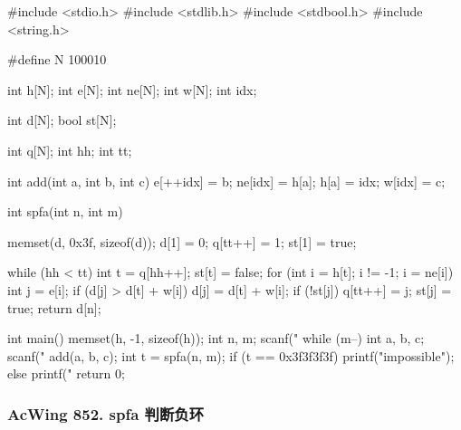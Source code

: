 \begin{mycpptwocol}[SPFA]
    #include <stdio.h>
    #include <stdlib.h>
    #include <stdbool.h>
    #include <string.h>

    #define N 100010

    int h[N];
    int e[N];
    int ne[N];
    int w[N];
    int idx;

    int d[N];
    bool st[N];

    int q[N];
    int hh;
    int tt;

    int add(int a, int b, int c) {
        e[++idx] = b;
        ne[idx] = h[a];
        h[a] = idx;
        w[idx] = c;
    }

    int spfa(int n, int m) {
        memset(d, 0x3f, sizeof(d));
        d[1] = 0;
        q[tt++] = 1;
        st[1] = true;

        while (hh < tt) {
            int t = q[hh++];
            st[t] = false;
            for (int i = h[t]; i != -1; i = ne[i]) {
                int j = e[i];
                if (d[j] > d[t] + w[i]) {
                    d[j] = d[t] + w[i];
                    if (!st[j]) {
                        q[tt++] = j;
                        st[j] = true;
                    }
                }
            }
        }
        return d[n];
    }

    int main() {
        memset(h, -1, sizeof(h));
        int n, m;
        scanf("%
        while (m--) {
            int a, b, c;
            scanf("%
            add(a, b, c);
        }
        int t = spfa(n, m);
        if (t == 0x3f3f3f3f) {
            printf("impossible");
        } else {
            printf("%
        }
        return 0;
    }
\end{mycpptwocol}

\subsubsection{AcWing 852. spfa 判断负环}

